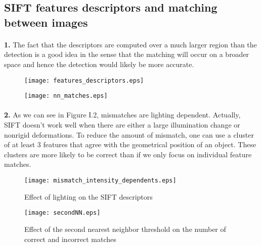\documentclass[11pt]{article}
\numberwithin{figure}{section} %
\begin{document}
\subsection{SIFT features descriptors and matching between images}
\paragraph{}\textbf{1.} The fact that the descriptors are computed over a much larger region than the detection is a good idea in the sense that the matching will occur on a broader space and hence the detection would likely be more accurate.

\begin{figure}[H]
\centering
\begin{minipage}{.5\textwidth}
  \centering
  \texttt{[image: features\_descriptors.eps]}
  \label{fig:test1}
\end{minipage}%
\begin{minipage}{.5\textwidth}
  \centering
  \texttt{[image: nn\_matches.eps]}
  \label{fig:test2}
\end{minipage}
\end{figure}

\paragraph{}\textbf{2.} As we can see in Figure I.2, mismatches are lighting dependent. Actually, SIFT doesn't work well when there are either a large illumination change or nonrigid deformations. To reduce the amount of mismatch, one can use a cluster of at least 3 features that agree with the geometrical position of an object. These clusters are more likely to be correct than if we only focus on individual feature matches.

\begin{figure}[H]
  \centering
	\texttt{[image: mismatch\_intensity\_dependents.eps]}
  \caption{Effect of lighting on the SIFT descriptors}
\end{figure}


\begin{figure}[H] 
  \centering
	\captionsetup{justification=centering}
	\texttt{[image: secondNN.eps]}
  \caption{Effect of the second nearest neighbor threshold on the number of correct and incorrect matches}
\end{figure}
\end{document}

